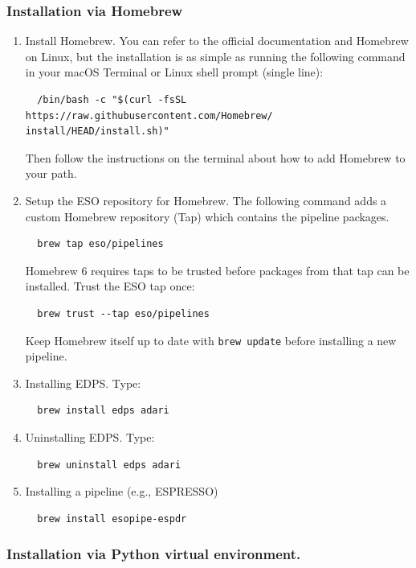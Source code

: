 \subsubsection{Installation via Homebrew}

\begin{enumerate}
\item Install Homebrew. You can refer to the official documentation and Homebrew on Linux, but the installation is as simple as running the following command in your macOS Terminal or Linux shell prompt (single line):
\begin{verbatim}
  /bin/bash -c "$(curl -fsSL https://raw.githubusercontent.com/Homebrew/
install/HEAD/install.sh)"
\end{verbatim}
Then follow the instructions on the terminal about how to add Homebrew to your path.

\item Setup the ESO repository for Homebrew.
The following command adds a custom Homebrew repository (Tap) which contains the pipeline packages.

\begin{verbatim}
  brew tap eso/pipelines
\end{verbatim}

Homebrew 6 requires taps to be trusted before packages from that tap can be installed. Trust the ESO tap once:

\begin{verbatim}
  brew trust --tap eso/pipelines
\end{verbatim}

Keep Homebrew itself up to date with {\tt brew update} before installing a new pipeline.

\item Installing EDPS. Type:

\begin{verbatim}
  brew install edps adari
\end{verbatim}
\item Uninstalling EDPS. Type:
  \begin{verbatim}
  brew uninstall edps adari
\end{verbatim}

\item Installing a pipeline (e.g., ESPRESSO)

\begin{verbatim}
  brew install esopipe-espdr
\end{verbatim}
\end{enumerate}
\subsubsection{Installation via Python virtual environment.}

